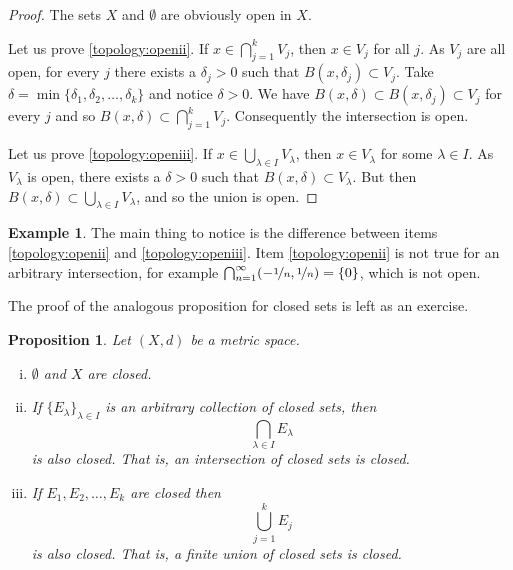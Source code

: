 \documentclass[12pt,openany]{book}
\theoremstyle{plain}
\newtheorem{prop}[thm]{Proposition}
\theoremstyle{remark}
\theoremstyle{definition}
\theoremstyle{exercise}
\theoremstyle{example}
\newtheorem{example}[thm]{Example}
\begin{document}
\begin{proof}
The sets $X$ and $\emptyset$ are obviously open in $X$.

Let us prove \ref{topology:openii}.
If $x \in \bigcap_{j=1}^k V_j$, then $x \in V_j$ for all $j$.
As $V_j$ are all open, for every $j$ there exists a $\delta_j > 0$ 
such that $B(x,\delta_j) \subset V_j$.  Take $\delta = \min \{
\delta_1,\delta_2,\ldots,\delta_k \}$ and notice $\delta > 0$.  We have
$B(x,\delta) \subset B(x,\delta_j) \subset V_j$ for every $j$ and so
$B(x,\delta) \subset \bigcap_{j=1}^k V_j$.  Consequently the intersection is open.

Let us prove \ref{topology:openiii}.
If $x \in \bigcup_{\lambda \in I} V_\lambda$, then $x \in V_\lambda$ for some
$\lambda \in I$.
As $V_\lambda$ is open, there exists a $\delta > 0$
such that $B(x,\delta) \subset V_\lambda$.  But then
$B(x,\delta) \subset \bigcup_{\lambda \in I} V_\lambda$,
and so the union is open.
\end{proof}

\begin{example}
The main thing to notice is the difference between
items
\ref{topology:openii} and \ref{topology:openiii}.
Item \ref{topology:openii} is not true for an arbitrary intersection,
for example $\bigcap_{n=1}^\infty (-\nicefrac{1}{n},\nicefrac{1}{n}) = \{ 0
\}$, which is not open.
\end{example}

The proof of the analogous proposition for closed sets
is left as an exercise.

\begin{prop} \label{prop:topology:closed}
Let $(X,d)$ be a metric space.
\begin{enumerate}[(i)]
\item \label{topology:closedi} $\emptyset$ and $X$ are closed.
\item \label{topology:closedii} If $\{ E_\lambda \}_{\lambda \in I}$ is
an arbitrary collection of closed sets, then
\begin{equation*}
\bigcap_{\lambda \in I} E_\lambda
\end{equation*}
is also closed.  That is, an intersection of closed sets is closed.
\item \label{topology:closediii} If $E_1, E_2, \ldots, E_k$ are closed then
\begin{equation*}
\bigcup_{j=1}^k E_j
\end{equation*}
is also closed.  That is, a finite union of closed sets is closed.
\end{enumerate}
\end{prop}
\end{document}
